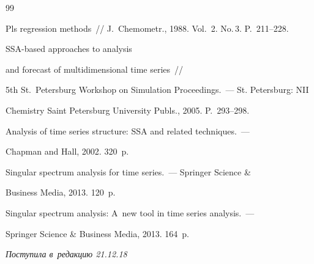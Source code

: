 {{\begin{thebibliography}{99}

Pls regression methods~/\!\!/ J.~Chemometr., 1988. Vol.~2. No.\,3. P.~211--228.






SSA-based approaches to analysis 

and forecast of multidimensional time series~/\!\!/ 

5th St.\ Petersburg Workshop on Simulation Proceedings.~--- St. Petersburg: NII 

Chemistry Saint Petersburg University Publs., 2005. P.~293--298.






Analysis of time series structure: SSA and related techniques.~---

Chapman and Hall, 2002. 320~p.






Singular spectrum analysis for time series.~--- Springer Science \& 

Business Media, 2013. 120~p.






Singular spectrum analysis: A~new tool in time series analysis.~---

Springer Science \& Business Media, 2013. 164~p.



        \end{thebibliography}

} }





\vspace*{-3pt}



\hfill{\small\textit{Поступила в~редакцию 21.12.18}}









